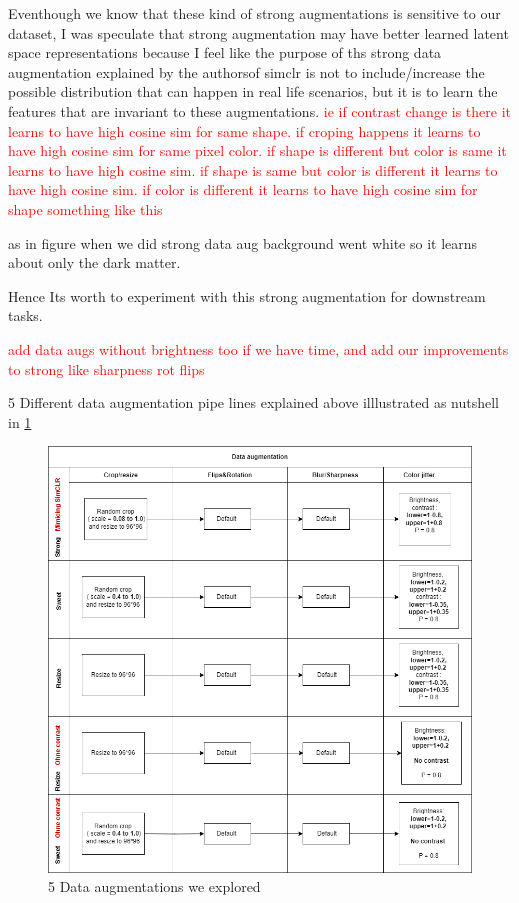 Eventhough we know that these kind of strong augmentations is sensitive to our dataset, I was speculate that strong augmentation may
 have better learned latent space representations because I feel like the purpose of ths strong data augmentation explained by the authorsof simclr is not to
 include/increase the possible distribution that can happen in real life scenarios, but it is to learn the features that are invariant to these augmentations.
 \textcolor{red}{ie if contrast change is there it learns to have high cosine sim for same shape. if croping happens it learns to have high cosine sim for same pixel 
 color. if shape is different but color is same it learns to have high cosine sim. if shape is same but color is different it learns to have high cosine sim. if  color
  is different it learns to have high cosine sim for shape something like this}

as in figure when we did strong data aug background went white so it learns about only the dark matter.

Hence Its worth to experiment with this strong augmentation for downstream tasks.

\textcolor{red}{add data augs without brightness too  if we have time, and add our improvements to strong like sharpness rot flips} 


5 Different data augmentation pipe lines explained above illlustrated as nutshell in \ref{fig:strong_aug}
\begin{figure}[H]
  \centering
  \includegraphics[scale=0.6]{figures/strong_aug.png} 
  \caption{5 Data augmentations we explored}
  \label{fig:strong_aug}
\end{figure}



